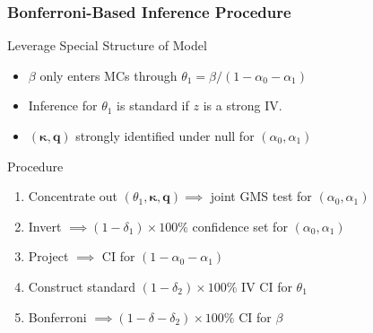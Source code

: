\documentclass{beamer}
\begin{document}
\begin{frame}
  \frametitle{Bonferroni-Based Inference Procedure}
  

  \begin{block}{Leverage Special Structure of Model}
    \begin{itemize}
      \item $\beta$ only enters MCs through $\theta_1 = \beta/ (1 - \alpha_0 - \alpha_1)$
      \item Inference for $\theta_1$ is standard if $z$ is a strong IV. 
      \item $(\boldsymbol{\kappa}, \mathbf{q})$ strongly identified under null for $(\alpha_0, \alpha_1)$
    \end{itemize}

    \begin{block}{Procedure}
      \begin{enumerate}
        \item Concentrate out $(\theta_1, \boldsymbol{\kappa}, \boldsymbol{q}) \implies$ joint GMS test for $(\alpha_0, \alpha_1)$ 
        \item Invert $\implies (1 - \delta_1)\times 100\%$ confidence set for $(\alpha_0, \alpha_1)$
        \item Project $\implies$ CI for $(1 - \alpha_0 - \alpha_1)$
        \item Construct standard $(1 - \delta_2)\times 100\%$ IV CI for $\theta_1$
        \item Bonferroni $\implies (1 - \delta - \delta_2)\times 100\%$ CI for $\beta$
      \end{enumerate}
    \end{block}
    
  \end{block}
  
\end{frame}
\begin{frame}
\begin{table}
  \scriptsize
  \centering
  
  \caption{Coverage (1 - size) of nominal 97.5\% GMS joint test for $(\alpha_0, \alpha_1)$.}
\end{table}
\end{frame}
\end{document}
